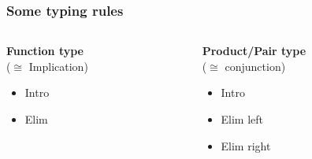 \documentclass{beamer}
\begin{document}
\begin{frame}
  \frametitle{Some typing rules}

  \begin{columns}
    \begin{column}{.5\textwidth}
      \textbf{\quad Function type} \\ \quad ($\cong$ Implication)
      \minipage[c][0.6\textheight][s]{\columnwidth}
      \vspace{0.05\textheight}
      \begin{itemize}[label=$\ast$]
      \item
        Intro
        \begin{prooftree}
        \end{prooftree}

      \item
        Elim
        \begin{prooftree}
        \end{prooftree}
      \end{itemize}
      \endminipage
    \end{column}

    \begin{column}{.5\textwidth}
      \textbf{\quad Product/Pair type} \\ \quad ($\cong$ conjunction)
      \minipage[c][0.6\textheight][s]{\columnwidth}
      \vspace{0.05\textheight}
      \begin{itemize}[label=$\ast$]
      \item
        Intro
        \begin{prooftree}
        \end{prooftree}
      \item
        Elim left
        \begin{prooftree}
        \end{prooftree}
      \item
        Elim right
        \begin{prooftree}
        \end{prooftree}
      \end{itemize}
      \endminipage
    \end{column}


\end{columns}
\end{frame}
\end{document}
